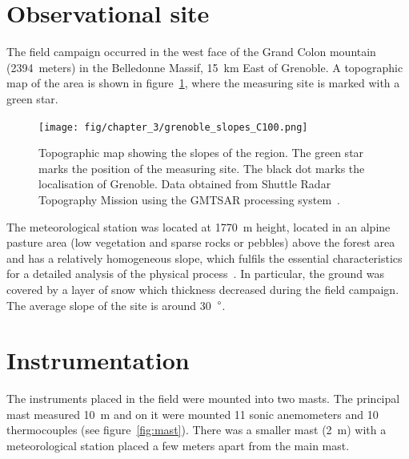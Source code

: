 \section{Observational site}

The field campaign occurred in the west face of the Grand Colon mountain (2394~meters) in the Belledonne Massif, 15~km East of Grenoble. A topographic map of the area is shown in figure~\ref{fig:obs_site}, where the measuring site is marked with a green star. %

\begin{figure}[!ht]
  \begin{center}
  \texttt{[image: fig/chapter\_3/grenoble\_slopes\_C100.png]}
  \caption{Topographic map showing the slopes of the region. The green star marks the position of the measuring site. The black dot marks the localisation of Grenoble. Data obtained from Shuttle Radar Topography Mission using the GMTSAR processing system~\citep{sandwell2011gmtsar}.}
  \label{fig:obs_site}
  \end{center}
\end{figure}

The meteorological station was located at 1770~m height, located in an alpine pasture area (low vegetation and sparse rocks or pebbles) above the forest area and
has a relatively homogeneous slope, which fulfils the essential characteristics for a detailed analysis of the physical process~\citep{blein2016observation}. In particular, the ground was covered by a layer of snow which thickness decreased during the field campaign. The average slope of the site is around 30~$\degree$.

\section{Instrumentation} \label{instrumentation}

The instruments placed in the field were mounted into two masts. The principal mast measured 10~m and on it were mounted 11 sonic anemometers and 10 thermocouples (see figure~\ref{fig:mast}). There was a smaller mast (2~m) with a meteorological station placed a few meters apart from the main mast. 


